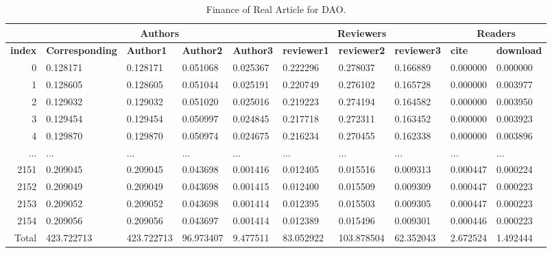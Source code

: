 \documentclass[lettersize,journal]{IEEEtran}
\begin{document}
\begin{table}[t!]
  \begin{center}
    \caption{Finance of Real Article for DAO.}
    \label{tab:realpaper}
    \begin{tabular}{r|l|l|l|l|l|l|l|l|l} %
       & \multicolumn{4}{c}{\textbf{Authors}} & \multicolumn{3}{|c|}{\textbf{Reviewers}} & \multicolumn{2}{c}{\textbf{Readers}}\\
       \hline
      \textbf{index} & \textbf{Corresponding} & \textbf{Author1} & \textbf{Author2} & \textbf{Author3} & \textbf{reviewer1} & \textbf{reviewer2} & \textbf{reviewer3} & \textbf{cite} & \textbf{download}\\
      \hline
      0 & 0.128171 & 0.128171 & 0.051068 & 0.025367 & 0.222296 & 0.278037 & 0.166889 & 0.000000 & 0.000000 \\
      1 & 0.128605 & 0.128605 & 0.051044 & 0.025191 & 0.220749 & 0.276102 & 0.165728 & 0.000000 & 0.003977 \\
      2 & 0.129032 & 0.129032 & 0.051020 & 0.025016 & 0.219223 & 0.274194 & 0.164582 & 0.000000 & 0.003950 \\
      3 & 0.129454 & 0.129454 & 0.050997 & 0.024845 & 0.217718 & 0.272311 & 0.163452 & 0.000000 & 0.003923 \\
      4 & 0.129870 & 0.129870 & 0.050974 & 0.024675 & 0.216234 & 0.270455 & 0.162338 & 0.000000 & 0.003896 \\
      ... & ... & ... & ... & ... & ... & ... & ... & ... & ... \\
      2151 & 0.209045 & 0.209045 & 0.043698 & 0.001416 & 0.012405 & 0.015516 & 0.009313 & 0.000447 & 0.000224 \\
      2152 & 0.209049 & 0.209049 & 0.043698 & 0.001415 & 0.012400 & 0.015509 & 0.009309 & 0.000447 & 0.000223 \\
      2153 & 0.209052 & 0.209052 & 0.043698 & 0.001414 & 0.012395 & 0.015503 & 0.009305 & 0.000447 & 0.000223 \\
      2154 & 0.209056 & 0.209056 & 0.043697 & 0.001414 & 0.012389 & 0.015496 & 0.009301 & 0.000446 & 0.000223 \\
      Total & 423.722713 & 423.722713 & 96.973407 & 9.477511 & 83.052922 & 103.878504 & 62.352043 & 2.672524 & 1.492444 \\
    \end{tabular}
  \end{center}
\end{table}
\end{document}
